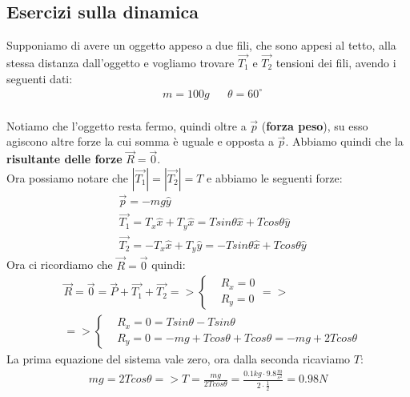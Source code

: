     \subsection{Esercizi sulla dinamica}
        Supponiamo di avere un oggetto appeso a due fili, che sono appesi al tetto, alla stessa distanza dall'oggetto e vogliamo trovare $\vec{T_1}$ e $\vec{T_2}$ tensioni dei fili, avendo i seguenti dati:
        \begin{align*}
            &m=100g&&\theta=60^{\circ}\\
        \end{align*}


        Notiamo che l'oggetto resta fermo, quindi oltre a $\vec{p}$ (\textbf{forza peso}), su esso agiscono altre forze la cui somma è uguale e opposta a $\vec{p}$. Abbiamo quindi che la \textbf{risultante delle forze} $\vec{R}=\vec{0}$.\\
        Ora possiamo notare che $|\vec{T_1}|=|\vec{T_2}|=T$ e abbiamo le seguenti forze:
        \begin{align*}
            &\vec{p}=-mg\hat{y}\\
            &\vec{T_1}=T_x\hat{x}+T_y\hat{x}=T sin\theta \hat{x}+T cos\theta \hat{y}\\
            &\vec{T_2}=-T_x\hat{x}+T_y\hat{y}=-T sin\theta \hat{x}+T cos\theta \hat{y}
        \end{align*}
        Ora ci ricordiamo che $\vec{R}=\vec{0}$ quindi:
        \begin{align*}
            &\vec{R}=\vec{0}=\vec{P}+\vec{T_1}+\vec{T_2}=>
            \begin{cases}
                &R_x=0\\
                &R_y=0
            \end{cases}=>\\
            &=>
            \begin{cases}
                &R_x=0=T sin\theta-T sin\theta\\
                &R_y=0=-mg+T cos\theta+T cos\theta=-mg+2Tcos\theta
            \end{cases}
            \end{align*}
                La prima equazione del sistema vale zero, ora dalla seconda ricaviamo $T$:
            \begin{align*}
            mg=2Tcos\theta=>T=\frac{mg}{2Tcos\theta}=\frac{0.1kg\cdot 9.8\frac{m}{s^2}}{2\cdot\frac{1}{2}}=0.98N
        \end{align*}

